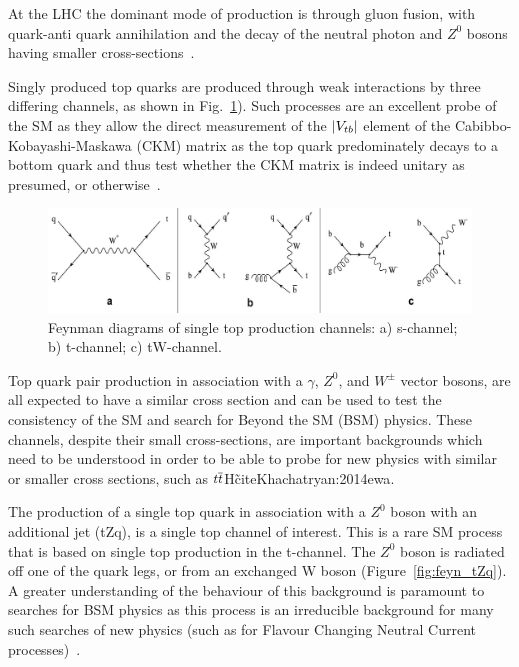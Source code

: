 At the LHC the dominant mode of production is through gluon fusion, with quark-anti quark annihilation and the decay of the neutral photon and $Z^{0}$ bosons having smaller cross-sections~\cite{Shibata:2008sy}.

Singly produced top quarks are produced through weak interactions by three differing channels, as shown in Fig.~\ref{fig:feyn_singletop}).
Such processes are an excellent probe of the SM as they allow the direct measurement of the $\lvert V_{tb} \rvert$ element of the Cabibbo-Kobayashi-Maskawa (CKM) matrix as the top quark predominately decays to a bottom quark and thus test whether the CKM matrix is indeed unitary as presumed, or otherwise~\cite{Shibata:2008sy}.

\begin{figure}[htbp]
\begin{center}
\includegraphics[width=1.00\textwidth]{figs/top-physics/singletop_feyn.jpg}
\caption{Feynman diagrams of single top production channels: a) s-channel; b) t-channel; c) tW-channel.}
\label{fig:feyn_singletop}
\end{center}
\end{figure}

Top quark pair production in association with a $\gamma$, $Z^{0}$, and $W^{\pm}$ vector bosons, are all expected to have a similar cross section and can be used to test the consistency of the SM and search for Beyond the SM (BSM) physics.
These channels, despite their small cross-sections, are important backgrounds which need to be understood in order to be able to probe for new physics with similar or smaller cross sections, such as $t\overline{t}$H\~cite{Khachatryan:2014ewa}.

The production of a single top quark in association with a $Z^{0}$ boson with an additional jet (tZq), is a single top channel of interest.
This is a rare SM process that is based on single top production in the t-channel. The $Z^{0}$ boson is radiated off one of the quark legs, or from an exchanged W boson (Figure~\ref{fig:feyn_tZq}).
A greater understanding of the behaviour of this background is paramount to searches for BSM physics as this process is an irreducible background for many such searches of new physics (such as for Flavour Changing Neutral Current processes)~\cite{Quadt}. 

